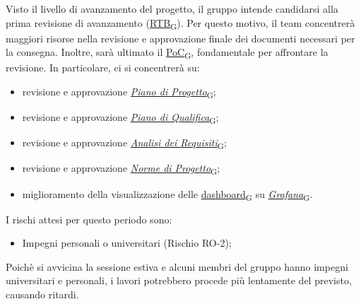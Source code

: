 Visto il livello di avanzamento del progetto, il gruppo intende candidarsi alla prima revisione di avanzamento (\href{https://7last.github.io/docs/rtb/documentazione-interna/glossario\#requirements-and-technology-baseline}{RTB\textsubscript{G}}). Per questo motivo, il team concentrerà maggiori risorse nella revisione e approvazione finale dei documenti necessari per la consegna. Inoltre, sarà ultimato il \href{https://7last.github.io/docs/rtb/documentazione-interna/glossario\#proof-of-concept}{PoC\textsubscript{G}}, fondamentale per affrontare la revisione. In particolare, ci si concentrerà su:
\begin{itemize}
	\item revisione e approvazione \href{https://7last.github.io/docs/rtb/documentazione-interna/glossario\#piano-di-progetto}{\textit{Piano di Progetto}\textsubscript{G}};
	\item revisione e approvazione \href{https://7last.github.io/docs/rtb/documentazione-interna/glossario\#piano-di-qualifica}{\textit{Piano di Qualifica}\textsubscript{G}};
	\item revisione e approvazione \href{https://7last.github.io/docs/rtb/documentazione-interna/glossario\#analisi-dei-requisiti}{\textit{Analisi dei Requisiti}\textsubscript{G}};
	\item revisione e approvazione \href{https://7last.github.io/docs/rtb/documentazione-interna/glossario\#norme-di-progetto}{\textit{Norme di Progetto}\textsubscript{G}};
	\item miglioramento della visualizzazione delle \href{https://7last.github.io/docs/rtb/documentazione-interna/glossario\#dashboard}{dashboard\textsubscript{G}} su \href{https://7last.github.io/docs/rtb/documentazione-interna/glossario\#grafana}{\textit{Grafana}\textsubscript{G}}.
\end{itemize}

\newpage

I rischi attesi per questo periodo sono:
\begin{itemize}
    \item Impegni personali o universitari (Rischio RO-2);
\end{itemize}
Poichè si avvicina la sessione estiva e alcuni membri del gruppo hanno impegni universitari e personali, i lavori potrebbero procede più lentamente del previsto, causando ritardi.

